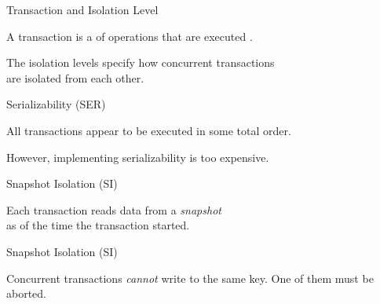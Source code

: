
\begin{frame}{Transaction and Isolation Level}
  \begin{center}
    A transaction is a  of operations
    that are executed .

    \vspace{0.30cm}
		\resizebox{0.55\textwidth}{!}{}

    \vspace{0.20cm}
    The isolation levels specify how concurrent transactions \\[2pt]
    are isolated from each other.
  \end{center}
\end{frame}

\begin{frame}{Serializability (SER)}
  \begin{center}
    All transactions appear to be executed in some total order.

    \vspace{0.30cm}
		\resizebox{0.50\textwidth}{!}{}

    \vspace{0.20cm}
    However, implementing serializability is too expensive.
  \end{center}
\end{frame}

\begin{frame}{Snapshot Isolation (SI)}
  \begin{center}
		\resizebox{0.50\textwidth}{!}{}

    \vspace{0.20cm}
     Each transaction reads data from a {\it snapshot} \\
      as of the time the transaction started.
  \end{center}
\end{frame}

\begin{frame}{Snapshot Isolation (SI)}
  \begin{center}
    \resizebox{0.48\textwidth}{!}{}
  \end{center}

  \vspace{-0.50cm}
    Concurrent transactions {\it cannot} write to the same key.
    One of them must be aborted.
\end{frame}

